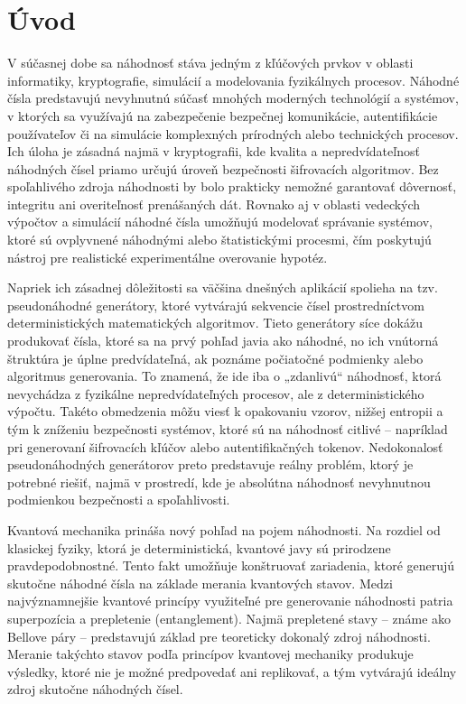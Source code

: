 
\chapter{Úvod}\label{ch:introduction}

V súčasnej dobe sa náhodnosť stáva jedným z kľúčových prvkov v oblasti informatiky, kryptografie, simulácií a modelovania fyzikálnych procesov. Náhodné čísla predstavujú nevyhnutnú súčasť mnohých moderných technológií a systémov, v ktorých sa využívajú na zabezpečenie bezpečnej komunikácie, autentifikácie používateľov či na simulácie komplexných prírodných alebo technických procesov. Ich úloha je zásadná najmä v kryptografii, kde kvalita a nepredvídateľnosť náhodných čísel priamo určujú úroveň bezpečnosti šifrovacích algoritmov. Bez spoľahlivého zdroja náhodnosti by bolo prakticky nemožné garantovať dôvernosť, integritu ani overiteľnosť prenášaných dát. Rovnako aj v oblasti vedeckých výpočtov a simulácií náhodné čísla umožňujú modelovať správanie systémov, ktoré sú ovplyvnené náhodnými alebo štatistickými procesmi, čím poskytujú nástroj pre realistické experimentálne overovanie hypotéz.

Napriek ich zásadnej dôležitosti sa väčšina dnešných aplikácií spolieha na tzv. pseudonáhodné generátory, ktoré vytvárajú sekvencie čísel prostredníctvom deterministických matematických algoritmov. Tieto generátory síce dokážu produkovať čísla, ktoré sa na prvý pohľad javia ako náhodné, no ich vnútorná štruktúra je úplne predvídateľná, ak poznáme počiatočné podmienky alebo algoritmus generovania. To znamená, že ide iba o „zdanlivú“ náhodnosť, ktorá nevychádza z fyzikálne nepredvídateľných procesov, ale z deterministického výpočtu. Takéto obmedzenia môžu viesť k opakovaniu vzorov, nižšej entropii a tým k zníženiu bezpečnosti systémov, ktoré sú na náhodnosť citlivé – napríklad pri generovaní šifrovacích kľúčov alebo autentifikačných tokenov. Nedokonalosť pseudonáhodných generátorov preto predstavuje reálny problém, ktorý je potrebné riešiť, najmä v prostredí, kde je absolútna náhodnosť nevyhnutnou podmienkou bezpečnosti a spoľahlivosti.

Kvantová mechanika prináša nový pohľad na pojem náhodnosti. Na rozdiel od klasickej fyziky, ktorá je deterministická, kvantové javy sú prirodzene pravdepodobnostné. Tento fakt umožňuje konštruovať zariadenia, ktoré generujú skutočne náhodné čísla na základe merania kvantových stavov. Medzi najvýznamnejšie kvantové princípy využiteľné pre generovanie náhodnosti patria superpozícia a prepletenie (entanglement). Najmä prepletené stavy – známe ako Bellove páry – predstavujú základ pre teoreticky dokonalý zdroj náhodnosti. Meranie takýchto stavov podľa princípov kvantovej mechaniky produkuje výsledky, ktoré nie je možné predpovedať ani replikovať, a tým vytvárajú ideálny zdroj skutočne náhodných čísel.

